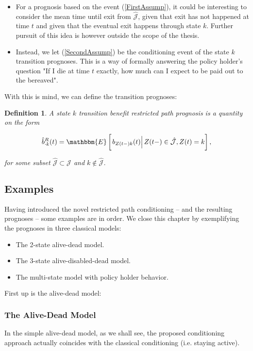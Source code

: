 \documentclass{article}
\newcommand{\1}[1]{\mathbbm{1}_{\left\lbrace #1 \right\rbrace}}
\newcommand{\econd}[2][def]{\mathbbm{E} \left[ \left. #1 \right| #2 \right]}
\theoremstyle{break}
\newtheorem{definition}{Definition}[section]
\theoremstyle{remark}
\numberwithin{equation}{section}
\begin{document}
\begin{itemize}
	\item For a prognosis based on the event (\ref{FirstAssump}), it could be interesting to consider the mean time until exit from $\hat{\mathcal{J}}$, given that exit has not happened at time $t$ and given that the eventual exit happens through state $k$. Further pursuit of this idea is however outside the scope of the thesis.
	\item Instead, we let (\ref{SecondAssump}) be the conditioning event of the state $k$ transition prognoses. This is a way of formally answering the policy holder's question "If I die at time $t$ exactly, how much can I expect to be paid out to the bereaved".
\end{itemize}

With this is mind, we can define the transition prognoses:

\begin{definition}
	A state $k$ transition benefit restricted path prognosis is a quantity on the form
	
	\begin{gather*}
		\hat{b}_{\cdot k}^R(t) = \econd[b_{Z(t-)k}(t)]{Z(t-) \in \hat{\mathcal{J}}, Z(t)=k},
	\end{gather*}
	
	for some subset $\hat{\mathcal{J}} \subset \mathcal{J}$ and $k \notin \hat{\mathcal{J}}$.
\end{definition}

\newpage

\subsection{Examples}

Having introduced the novel restricted path conditioning -- and the resulting prognoses -- some examples are in order. We close this chapter by exemplifying the prognoses in three classical models:

\begin{itemize}
	\item The 2-state alive-dead model.
	\item The 3-state alive-disabled-dead model.
	\item The multi-state model with policy holder behavior.
\end{itemize}

First up is the alive-dead model:

\subsubsection{The Alive-Dead Model}
In the simple alive-dead model, as we shall see, the proposed conditioning approach actually coincides with the classical conditioning (i.e. staying active).
\end{document}
